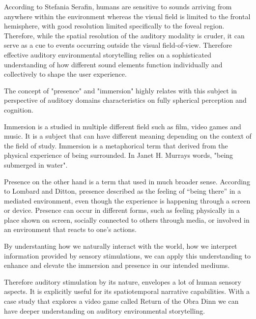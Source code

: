             According to Stefania Serafin, humans are sensitive to sounds arriving from anywhere within the environment whereas the visual field is limited to the frontal hemisphere, with good resolution limited specifically to the foveal region. Therefore, while the spatial resolution of the auditory modality is cruder, it can serve as a cue to events occurring outside the visual field-of-view\cite{Sonic_Interaction_in_Virtual_Environments}. Therefore effective auditory environmental storytelling relies on a sophisticated understanding of how different sound elements function individually and collectively to shape the user experience.\par

            The concept of "presence" and "immersion" highly relates with this subject in perspective of auditory domains characteristics on fully spherical perception and cognition.\par

            Immersion is a studied in multiple different field such as film, video games and music. It is a subject that can have different meaning depending on the context of the field of study\cite{Sonic_Interaction_in_Virtual_Environments}. Immersion is a metaphorical term that derived from the physical experience of being surrounded. In Janet H. Murrays words, "being submerged in water"\cite{Hamlet_on_the_Holodeck}. 

            Presence on the other hand is a term that used in much broader sense. According to Lombard and Ditton, presence described as the feeling of “being there” in a mediated environment, even though the experience is happening through a screen or device. Presence can occur in different forms, such as feeling physically in a place shown on screen, socially connected to others through media, or involved in an environment that reacts to one’s actions\cite{Concept_of_Presence}.

            By understanting how we naturally interact with the world, how we interpret information provided by sensory stimulations, we can apply this understanding to enhance and elevate the immersion and presence in our intended mediums.\par

            Therefore auditory stimulation by its nature, envelopes a lot of human sensory aspects. It is explicitly useful for its spatiotemporal narrative capabilities. With a case study that explores a video game called Return of the Obra Dinn we can have deeper understanding on auditory environmental storytelling.\par

